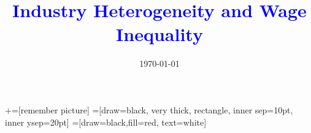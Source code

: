 \documentclass[notes,11pt, aspectratio=169]{beamer}
\title[]{\textcolor{blue}{Industry Heterogeneity and Wage Inequality}}
\author[MVB]{}
\institute[UW-Madison]{Mitchell Valdes-Bobes}
\date{\today}
\begin{document}
\newcommand\marktopleft[1]{%
    \tikz[overlay,remember picture] 
        \node (marker-#1-a) at (-.3em,.3em) {};%
}
\newcommand\markbottomright[2]{%
    \tikz[overlay,remember picture] 
        \node (marker-#1-b) at (0em,0em) {};%
}
+=[remember picture] 
 =[draw=black, very thick, rectangle, inner sep=10pt, inner ysep=20pt]
 =[draw=black,fill=red, text=white]

\begin{frame}
	\maketitle
\end{frame}
\end{document}
